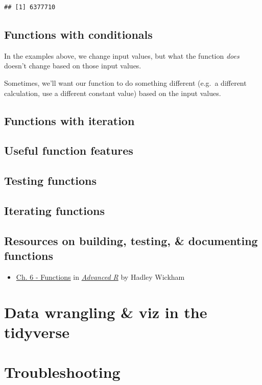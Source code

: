 \documentclass[
]{book}
\providecommand{\tightlist}{%
  \setlength{\itemsep}{0pt}\setlength{\parskip}{0pt}}
\begin{document}
\begin{verbatim}
## [1] 6377710
\end{verbatim}

\hypertarget{functions-with-conditionals}{%
\section{Functions with conditionals}\label{functions-with-conditionals}}

In the examples above, we change input values, but what the function \emph{does} doesn't change based on those input values.

Sometimes, we'll want our function to do something different (e.g.~a different calculation, use a different constant value) based on the input values.

\hypertarget{functions-with-iteration}{%
\section{Functions with iteration}\label{functions-with-iteration}}

\hypertarget{useful-function-features}{%
\section{Useful function features}\label{useful-function-features}}

\hypertarget{testing-functions}{%
\section{Testing functions}\label{testing-functions}}

\hypertarget{iterating-functions}{%
\section{Iterating functions}\label{iterating-functions}}

\hypertarget{resources-on-building-testing-documenting-functions}{%
\section{Resources on building, testing, \& documenting functions}\label{resources-on-building-testing-documenting-functions}}

\begin{itemize}
\tightlist
\item
  \href{https://adv-r.hadley.nz/functions.html}{Ch. 6 - Functions} in \href{https://adv-r.hadley.nz/}{\emph{Advanced R}} by Hadley Wickham
\end{itemize}

\hypertarget{tidyverse}{%
\chapter{Data wrangling \& viz in the tidyverse}\label{tidyverse}}

\hypertarget{troubleshooting}{%
\chapter{Troubleshooting}\label{troubleshooting}}

  
\end{document}

